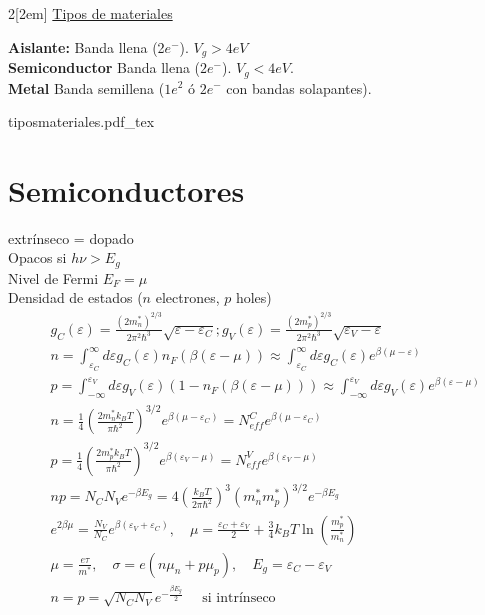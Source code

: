\documentclass[leqno]{article}
\newcommand{\incfig}[1]{%
\begin{center}
\def\svgwidth{0.9\columnwidth}
{#1.pdf_tex}
\end{center}
}
\begin{document}
\begin{multicols}{2}[\columnsep2em]
\underline{Tipos de materiales}

\textbf{Aislante:} Banda llena (2$e^-$). $V_g>4eV$\\
\textbf{Semiconductor} Banda llena ($2e^-$).  $V_g<4eV$.\\
\textbf{Metal} Banda semillena ($1e^2$ ó $2e^-$ con bandas solapantes).

\incfig{tiposmateriales}

\section{Semiconductores}
extrínseco = dopado\\
Opacos si $h \nu > E_g$\\
Nivel de Fermi $E_F = \mu$\\
Densidad de estados ($n$ electrones, $p$ holes)
\begin{align*}
&g_C(\varepsilon ) = \frac{(2m^*_n) ^{2 /3}}{2\pi ^2\hbar ^3}\sqrt{\varepsilon -\varepsilon _C} ; 
g_V(\varepsilon ) = \frac{(2m^*_p) ^{2 /3}}{2\pi ^2\hbar ^3}\sqrt{\varepsilon _V-\varepsilon } \\
& n = \int_{\varepsilon _C}^\infty d\varepsilon g_C(\varepsilon )n_F(\beta (\varepsilon -\mu ))\approx \int _{\varepsilon _C}^\infty d\varepsilon g_C(\varepsilon ) e ^{\beta (\mu -\varepsilon )}\\
& p = \int^{\varepsilon _V}_{-\infty} d\varepsilon g_V(\varepsilon )(1-n_F(\beta (\varepsilon -\mu )))\approx \int ^{\varepsilon _V}_{-\infty} d\varepsilon g_V(\varepsilon ) e ^{\beta (\varepsilon-\mu )}\\
&n = \frac{1}{4}\left(\frac{2 m^*_nk_BT}{\pi \hbar ^2}\right)^{3 /2} e ^{\beta(\mu -\varepsilon _C)} = N_{eff}^C e ^{\beta (\mu -\varepsilon _C)}\\
&p = \frac{1}{4}\left(\frac{2 m^*_pk_BT}{\pi \hbar ^2}\right)^{3 /2} e ^{\beta(\varepsilon _V-\mu )} = N_{eff}^V e ^{\beta (\varepsilon _V-\mu )}\\
& np = N_CN_V e ^{-\beta E_g} = 4 \left(\frac{k_BT}{2\pi \hbar ^2}\right)^3(m_n^*m_p^*)^{3 / 2}e ^{-\beta E_g}\\
& e ^{2\beta \mu } = \frac{N_V}{N_C} e ^{\beta (\varepsilon _V + \varepsilon _C)}, \quad
\mu  = \frac{\varepsilon _C+\varepsilon _V}{2} + \frac{3}{4}k_BT\ln\left( \frac{m_p^*}{m_n^*} \right) \\
& \mu = \frac{e\tau }{m^*}, \quad \sigma  = e(n\mu _n+ p\mu _p), \quad E_g = \varepsilon _C-\varepsilon _V\\
& n = p = \sqrt{N_CN_V}e ^{-\frac{\beta E_g}{2}} \quad \text{ si intrínseco}

\end{align*}
\end{multicols}
\end{document}
